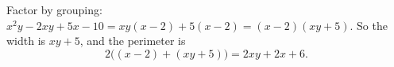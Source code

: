 Factor by grouping: $x^2y-2xy+5x-10=xy(x-2)+5(x-2)=(x-2)(xy+5)$. So the width is $xy+5$, and the perimeter is
\[
2\bigl((x-2)+(xy+5)\bigr)=\boxed{2xy+2x+6}.
\]
